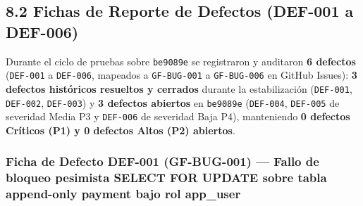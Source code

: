 \documentclass[10pt,a4paper]{article}
\begin{document}
\endgroup\medskip


\subsection{8.2 Fichas de Reporte de Defectos (DEF-001 a DEF-006)}\label{82-fichas-de-reporte-de-defectos-def-001-a-def-006}

Durante el ciclo de pruebas sobre \texttt{be9089e} se registraron y auditaron \textbf{6 defectos} (\texttt{DEF-{}\allowbreak{}001} a \texttt{DEF-{}\allowbreak{}006}, mapeados a \texttt{GF-{}\allowbreak{}BUG-{}\allowbreak{}001} a \texttt{GF-{}\allowbreak{}BUG-{}\allowbreak{}006} en GitHub Issues): \textbf{3 defectos históricos resueltos y cerrados} durante la estabilización (\texttt{DEF-{}\allowbreak{}001}, \texttt{DEF-{}\allowbreak{}002}, \texttt{DEF-{}\allowbreak{}003}) y \textbf{3 defectos abiertos} en \texttt{be9089e} (\texttt{DEF-{}\allowbreak{}004}, \texttt{DEF-{}\allowbreak{}005} de severidad Media P3 y \texttt{DEF-{}\allowbreak{}006} de severidad Baja P4), manteniendo \textbf{0 defectos Críticos (P1) y 0 defectos Altos (P2) abiertos}.


\subsubsection{Ficha de Defecto DEF-001 (GF-BUG-001) --- Fallo de bloqueo pesimista SELECT FOR UPDATE sobre tabla append-only payment bajo rol app\_user}\label{ficha-de-defecto-def-001-gf-bug-001--fallo-de-bloqueo-pesimista-select-for-update-sobre-tabla-append-only-payment-bajo-rol-app_user}

\begingroup\singlespacing\footnotesize\setlength{\parskip}{0pt}
\end{document}
